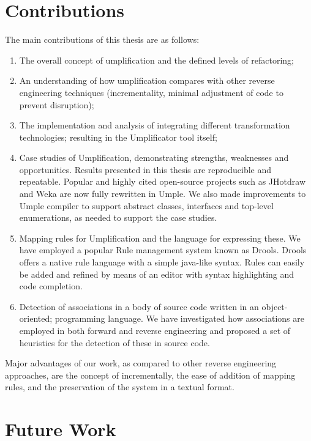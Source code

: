 \section{Contributions}

The main contributions of this thesis are as follows:

\begin{enumerate}
\item The overall concept of umplification and the defined levels of refactoring;

\item An understanding of how umplification compares with other reverse engineering techniques (incrementality, minimal adjustment of code to prevent disruption);

\item The implementation and analysis of integrating different transformation technologies;  resulting in the Umplificator tool itself;

\item Case studies of Umplification, demonstrating strengths, weaknesses and opportunities. Results presented in this thesis are reproducible and repeatable. Popular and highly cited open-source projects such as JHotdraw and Weka are now fully rewritten in Umple. We also made improvements to Umple compiler  to support abstract classes, interfaces and top-level enumerations, as needed to support the case studies.

\item Mapping rules for Umplification and the language for expressing these. We have employed a popular Rule management system known as Drools. Drools offers a native rule language with a simple java-like syntax. Rules can easily be added and refined by means of an editor with syntax highlighting and code completion.

\item Detection of associations in a body of source code written in an object-oriented;
programming language. We have investigated how associations are employed in both forward and reverse engineering and proposed a set of heuristics for the detection of these in source code.
\end{enumerate}

Major advantages of our work, as compared to other reverse engineering approaches, are the concept of incrementally, the ease of addition of mapping rules, and the preservation of the system in a textual format.

\section{Future Work}

